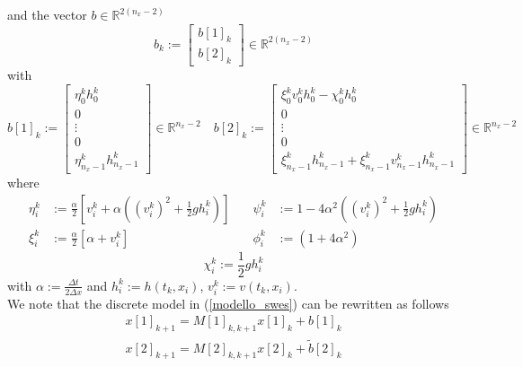 {and the vector $b\in \mathbb{R}^{2(n_{x}-2)}$
\begin{equation}
b_{k}:=\left[\begin{array}{ll}
b[1]_{k}\\
b[2]_{k}
\end{array}\right]\in \mathbb{R}^{2(n_{x}-2)}
\end{equation}
with 
\begin{equation}\label{b[1]}
b[1]_{k}:=\left[\begin{array}{ll}
\eta_{0}^{k}h_{0}^{k}\\
0\\
\vdots\\
0\\
\eta_{n_{x}-1}^{k}h_{n_{x}-1}^{k}
\end{array}\right]\in \mathbb{R}^{n_{x}-2} \quad 
b[2]_{k}:=\left[\begin{array}{ll}
\xi_{0}^{k}v_{0}^{k}h_{0}^{k}-\chi_{0}^{k}h_{0}^{k}\\
0\\
\vdots
\\
0
\\
\xi_{n_{x}-1}^{k}h_{n_{x}-1}^{k}+\xi_{n_{x}-1}^{k}v_{n_{x}-1}^{k}h_{n_{x}-1}^{k}
\end{array}\right]\in \mathbb{R}^{n_{x}-2} 
\end{equation}
}
\noindent where 
\begin{displaymath}
\begin{array}{lllllll}
\eta_{i}^{k}&:=\frac{\alpha}{2}[v_{i}^{k}+\alpha((v_{i}^{k})^{2}+\frac{1}{2}gh_{i}^{k})] & \quad  \psi_{i}^{k}&:=1-4\alpha^{2}((v_{i}^{k})^{2}+\frac{1}{2}gh_{i}^{k})\\
\xi_{i}^{k}&:=\frac{\alpha}{2}[\alpha + v_{i}^{k}] & \quad  \phi_{i}^{k}&:=\left(1+4\alpha^{2}\right)
\end{array}
\end{displaymath}
\begin{displaymath}
\chi_{i}^{k}:=\frac{1}{2}gh_{i}^{k}
\end{displaymath}
with $\alpha:=\frac{\Delta t}{2\Delta x}$ and $h_{i}^{k}:=h(t_{k},x_{i})$, $v_{i}^{k}:=v(t_{k},x_{i})$.\\
We note that the discrete model in (\ref{modello_swes}) can be rewritten as follows
\begin{equation}\label{1-2_model}
\begin{array}{ll}
x[1]_{k+1}={M}[1]_{k,k+1}x[1]_{k}+b[1]_{k}\\
x[2]_{k+1}={M}[2]_{k,k+1}x[2]_{k}+\tilde{b}[2]_{k}
\end{array}
\end{equation}

